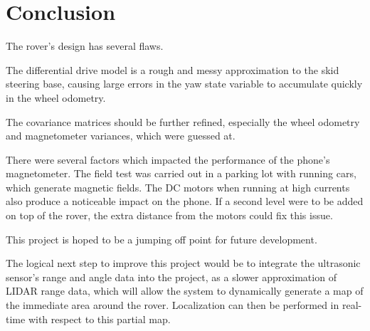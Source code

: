 \chapter*{Conclusion}

The rover's design has several flaws.

The differential drive model is a rough and messy approximation to the skid steering base, causing large errors in the yaw state variable to accumulate quickly in the wheel odometry.

The covariance matrices should be further refined, especially the wheel odometry and magnetometer variances, which were guessed at.


There were several factors which impacted the performance of the phone's magnetometer. The field test was carried out in a parking lot with running cars, which generate magnetic fields. The DC motors when running at high currents also produce a noticeable impact on the phone. If a second level were to be added on top of the rover, the extra distance from the motors could fix this issue.


This project is hoped to be a jumping off point for future development.

The logical next step to improve this project would be to integrate the ultrasonic sensor's range and angle data into the project, as a slower approximation of LIDAR range data, which will allow the system to dynamically generate a map of the immediate area around the rover. Localization can then be performed in real-time with respect to this partial map.




